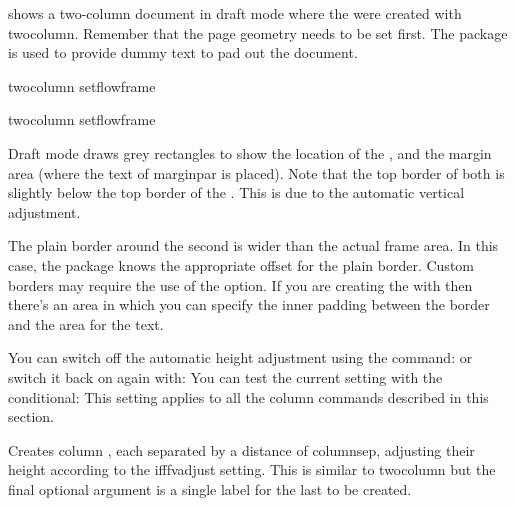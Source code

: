 \documentclass[fontsize=12pt]{scrbook}
\newcommand{\frameoptval}[2]{\optval{frame.#1}{#2}}
\begin{document}
 shows a two-column document in draft
mode where the  were created with \gls{twocolumn}.
Remember that the page geometry needs to be set first.
The  package is used to provide dummy text to pad out
the document.
\begin{codebox}
\oarg{12pt}
\gls{twocolumn}
\gls{setflowframe}\marg{\frameoptval{border}{plain}}
\end{codebox}

{%
\nl
{}\nl
{}\nl
\gls{twocolumn}\nl
\gls{setflowframe}\marg{\frameoptval{border}{plain}}
}
{%
}


Draft mode draws grey rectangles to show the location of the
,  and the margin area (where the text of
\gls{marginpar} is placed). Note that the top border of both
 is slightly below the top border of the
. This is due to the automatic vertical adjustment.

The plain border around the second  is wider than
the actual frame area. In this case, the  package
knows the appropriate offset for the plain border. Custom
borders may require the use of the  option.
If you are creating the  with  then
there's an area in which you can specify the inner padding between
the border and the area for the text.

You can switch off the automatic height adjustment using the command:
or switch it back on again with:
You can test the current setting with the conditional:
This setting applies to all the column commands described in this
section.

Creates  column , each separated by a
distance of \gls{columnsep}, adjusting their height according to the
\gls{ifffvadjust} setting. This is similar to \gls{twocolumn} but
the final optional argument is a single label for the last
 to be created.
\end{document}
